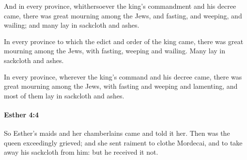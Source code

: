 			\begin{versebox}
					\item[BHS] 
					\item[LXX] 
					\item[ASV] And in every province, whithersoever the king's commandment and his decree came, there was great mourning among the Jews, and fasting, and weeping, and wailing; and many lay in sackcloth and ashes.
					\item[NIV] In every province to which the edict and order of the king came, there was great mourning among the Jews, with fasting, weeping and wailing. Many lay in sackcloth and ashes.
					\item[NRSV] In every province, wherever the king’s command and his decree came, there was great mourning among the Jews, with fasting and weeping and lamenting, and most of them lay in sackcloth and ashes.
			\end{versebox}

		\paragraph{Esther 4:4} %
			\label{ESTHER-4-4}

			So Esther’s maids and her chamberlains came and told it her. Then was the queen exceedingly grieved; and she sent raiment to clothe Mordecai, and to take away his sackcloth from him: but he received it not.

